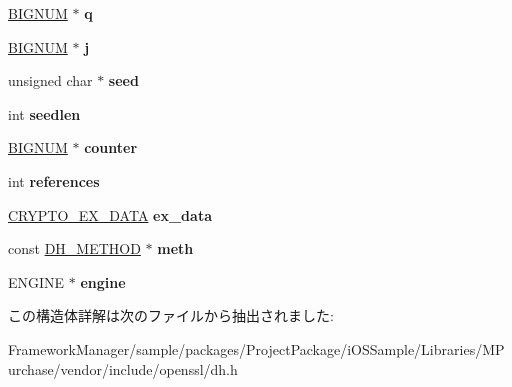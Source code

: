 \begin{DoxyCompactItemize}
\item 
\hypertarget{structdh__st_a6bbb03a3acdbab173e1b4f74bf53d581}{}\hyperlink{structbignum__st}{B\+I\+G\+N\+U\+M} $\ast$ {\bfseries q}\label{structdh__st_a6bbb03a3acdbab173e1b4f74bf53d581}

\item 
\hypertarget{structdh__st_af6140cb07291cd40b23442d1466ec114}{}\hyperlink{structbignum__st}{B\+I\+G\+N\+U\+M} $\ast$ {\bfseries j}\label{structdh__st_af6140cb07291cd40b23442d1466ec114}

\item 
\hypertarget{structdh__st_ae0d5af379d1113d5d2c402f9d2d85d49}{}unsigned char $\ast$ {\bfseries seed}\label{structdh__st_ae0d5af379d1113d5d2c402f9d2d85d49}

\item 
\hypertarget{structdh__st_a07d3bf5a4dcd263d27d42c92c74d42ef}{}int {\bfseries seedlen}\label{structdh__st_a07d3bf5a4dcd263d27d42c92c74d42ef}

\item 
\hypertarget{structdh__st_a68f2d92b8bc2abd3f0f1d31b061eaf07}{}\hyperlink{structbignum__st}{B\+I\+G\+N\+U\+M} $\ast$ {\bfseries counter}\label{structdh__st_a68f2d92b8bc2abd3f0f1d31b061eaf07}

\item 
\hypertarget{structdh__st_a12e77dc7593509a21bf3362b97f472b7}{}int {\bfseries references}\label{structdh__st_a12e77dc7593509a21bf3362b97f472b7}

\item 
\hypertarget{structdh__st_a82bd75ac9a0b1c3a698c28a87e56a78f}{}\hyperlink{structcrypto__ex__data__st}{C\+R\+Y\+P\+T\+O\+\_\+\+E\+X\+\_\+\+D\+A\+T\+A} {\bfseries ex\+\_\+data}\label{structdh__st_a82bd75ac9a0b1c3a698c28a87e56a78f}

\item 
\hypertarget{structdh__st_ae98dc2f23940781bceeb2b4cb931a2a3}{}const \hyperlink{structdh__method}{D\+H\+\_\+\+M\+E\+T\+H\+O\+D} $\ast$ {\bfseries meth}\label{structdh__st_ae98dc2f23940781bceeb2b4cb931a2a3}

\item 
\hypertarget{structdh__st_ab4369fbdcf15e3937755fd06420bd5b5}{}E\+N\+G\+I\+N\+E $\ast$ {\bfseries engine}\label{structdh__st_ab4369fbdcf15e3937755fd06420bd5b5}

\end{DoxyCompactItemize}


この構造体詳解は次のファイルから抽出されました\+:\begin{DoxyCompactItemize}
\item 
Framework\+Manager/sample/packages/\+Project\+Package/i\+O\+S\+Sample/\+Libraries/\+M\+Purchase/vendor/include/openssl/dh.\+h\end{DoxyCompactItemize}
